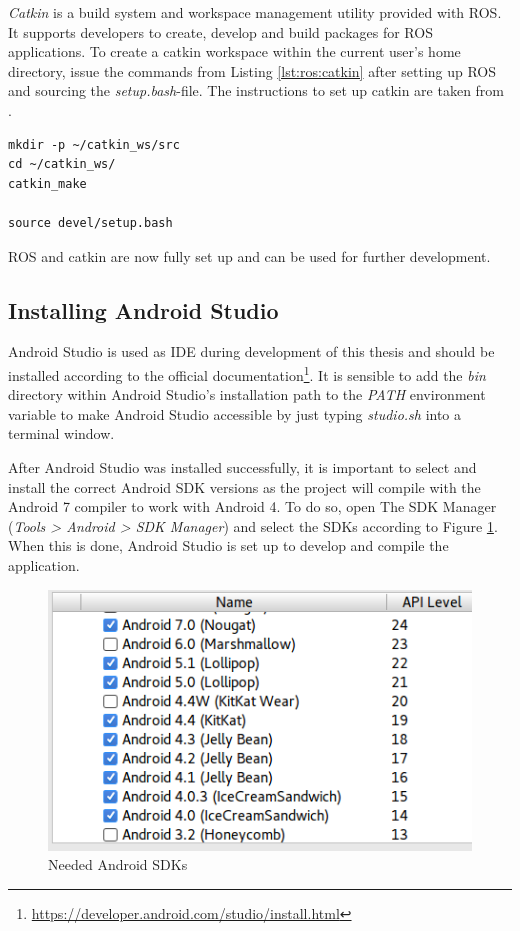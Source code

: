 \textit{Catkin} is a build system and workspace management utility provided with ROS. It supports developers to create, develop and build packages for ROS applications. To create a catkin workspace within the current user's home directory, issue the commands from Listing \ref{lst:ros:catkin} after setting up ROS and sourcing the \textit{setup.bash}-file. The instructions to set up catkin are taken from \cite{ros:install:catkin}.

\begin{minipage}{\linewidth}
	\begin{lstlisting}[caption={Setting up a catkin workspace},label=lst:ros:catkin]
mkdir -p ~/catkin_ws/src
cd ~/catkin_ws/
catkin_make

source devel/setup.bash
	\end{lstlisting}
\end{minipage}

ROS and catkin are now fully set up and can be used for further development.

\subsection{Installing Android Studio}

Android Studio is used as IDE during development of this thesis and should be installed according to the official documentation\footnote{\url{https://developer.android.com/studio/install.html}}. It is sensible to add the \textit{bin} directory within Android Studio's installation path to the \textit{PATH} environment variable to make Android Studio accessible by just typing \textit{studio.sh} into a terminal window.

After Android Studio was installed successfully, it is important to select and install the correct Android SDK versions as the project will compile with the Android 7 compiler to work with Android 4. To do so, open The SDK Manager (\textit{Tools > Android > SDK Manager}) and select the SDKs according to Figure \ref{fig:android:sdk}. When this is done, Android Studio is set up to develop and compile the application.

\begin{figure}
	\caption{Needed Android SDKs\label{fig:android:sdk}}
	\begin{center}
		\includegraphics[scale=0.7]{assets/chpt_impl/sdks.PNG}
	\end{center}
\end{figure}

